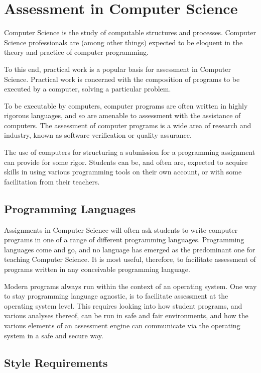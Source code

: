 
\section{Assessment in Computer Science}

Computer Science is the study of computable structures and processes. Computer
Science professionals are (among other things) expected to be eloquent in the
theory and practice of computer programming\cite{cs-curricula-2013}.

To this end, practical work is a popular basis for assessment in Computer
Science\cite{carter-et-al-2003}. Practical work is concerned with the
composition of programs to be executed by a computer, solving a particular
problem.

To be executable by computers, computer programs are often written in highly
rigorous languages, and so are amenable to assessment with the assistance of
computers. The assessment of computer programs is a wide area of research and
industry, known as software verification or quality assurance.

The use of computers for structuring a submission for a programming assignment
can provide for some rigor. Students can be, and often are, expected to acquire
skills in using various programming tools on their own account, or with some
facilitation from their teachers.

\subsection{Programming Languages}

Assignments in Computer Science will often ask students to write computer
programs in one of a range of different programming languages. Programming
languages come and go, and no language has emerged as the predominant one for
teaching Computer Science. It is most useful, therefore, to facilitate
assessment of programs written in any conceivable programming language.

Modern programs always run within the context of an operating system. One way
to stay programming language agnostic, is to facilitate assessment at the
operating system level. This requires looking into how student programs, and
various analyses thereof, can be run in safe and fair environments, and how the
various elements of an assessment engine can communicate via the operating
system in a safe and secure way.

\subsection{Style Requirements}

